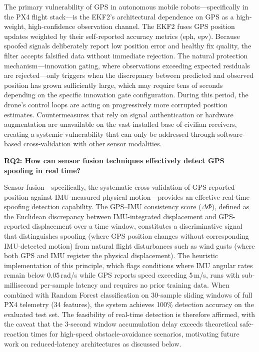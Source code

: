 The primary vulnerability of GPS in autonomous mobile robots---specifically in the PX4 flight stack---is the EKF2's architectural dependence on GPS as a high-weight, high-confidence observation channel. The EKF2 fuses GPS position updates weighted by their self-reported accuracy metrics (eph, epv). Because spoofed signals deliberately report low position error and healthy fix quality, the filter accepts falsified data without immediate rejection. The natural protection mechanism---innovation gating, where observations exceeding expected residuals are rejected---only triggers when the discrepancy between predicted and observed position has grown sufficiently large, which may require tens of seconds depending on the specific innovation gate configuration. During this period, the drone's control loops are acting on progressively more corrupted position estimates. Countermeasures that rely on signal authentication or hardware augmentation are unavailable on the vast installed base of civilian receivers, creating a systemic vulnerability that can only be addressed through software-based cross-validation with other sensor modalities.

\textbf{RQ2: How can sensor fusion techniques effectively detect GPS spoofing in real time?}

Sensor fusion---specifically, the systematic cross-validation of GPS-reported position against IMU-measured physical motion---provides an effective real-time spoofing detection capability. The GPS--IMU consistency score (\(\Delta \Phi\)), defined as the Euclidean discrepancy between IMU-integrated displacement and GPS-reported displacement over a time window, constitutes a discriminative signal that distinguishes spoofing (where GPS position changes without corresponding IMU-detected motion) from natural flight disturbances such as wind gusts (where both GPS and IMU register the physical displacement). The heuristic implementation of this principle, which flags conditions where IMU angular rates remain below 0.05\,rad/s while GPS reports speed exceeding 5\,m/s, runs with sub-millisecond per-sample latency and requires no prior training data. When combined with Random Forest classification on 30-sample sliding windows of full PX4 telemetry (34 features), the system achieves 100\% detection accuracy on the evaluated test set. The feasibility of real-time detection is therefore affirmed, with the caveat that the 3-second window accumulation delay exceeds theoretical safe-reaction times for high-speed obstacle-avoidance scenarios, motivating future work on reduced-latency architectures as discussed below.

